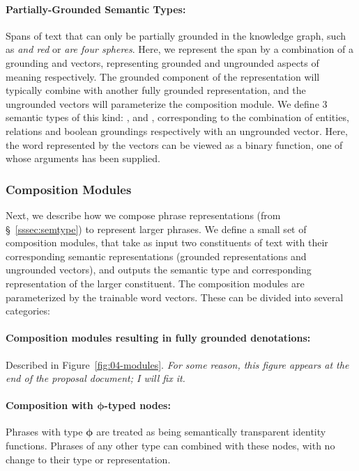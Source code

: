 \documentclass[main.tex]{subfiles}
\begin{document}


\paragraph{Partially-Grounded Semantic Types:}
Spans of text that can only be partially grounded in the knowledge graph, such as \emph{and red} or \emph{are four spheres}. Here, we represent the span by a combination of a grounding and vectors, representing grounded and ungrounded aspects of meaning respectively.
The grounded component of the representation will typically combine with another fully grounded representation, and the ungrounded vectors will parameterize the composition module.
We define 3 semantic types of this kind: ,  and , corresponding to the combination of entities, relations and boolean groundings respectively with an ungrounded vector. Here, the word represented by the vectors can be viewed as a binary function, one of whose arguments has been supplied.


\subsubsection{Composition Modules}
\label{sssec:comprules}
Next, we describe how we compose phrase representations (from \S~\ref{sssec:semtype}) to represent larger phrases.
We define a small set of composition modules, that take as input two constituents of text with their corresponding semantic representations (grounded representations and ungrounded vectors), and outputs the semantic type and corresponding representation of the larger constituent.
The composition modules are parameterized by the trainable word vectors.
These can be divided into several categories:

\paragraph{Composition modules resulting in fully grounded denotations:} Described in Figure~\ref{fig:04-modules}.
\textit{For some reason, this figure appears at the end of the proposal document; I will fix it.}



\paragraph{Composition with $\pmb{\phi}$-typed nodes:} Phrases with type $\pmb{\phi}$ are treated as being semantically transparent identity functions. Phrases of any other type can combined with these nodes, with no change to their type or representation.
\end{document}
